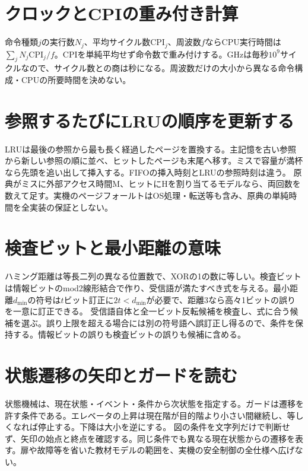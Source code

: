 \section{クロックとCPIの重み付き計算}
\label{theory:information:cpu}
命令種類\(j\)の実行数\(N_j\)、平均サイクル数\(\mathrm{CPI}_j\)、周波数\(f\)ならCPU実行時間は\(\sum_jN_j\mathrm{CPI}_j/f\)。CPIを単純平均せず命令数で重み付けする。GHzは毎秒\(10^9\)サイクルなので、サイクル数との商は秒になる。周波数だけの大小から異なる命令構成・CPUの所要時間を決めない。

\section{参照するたびにLRUの順序を更新する}
\label{theory:information:lru}
LRUは最後の参照から最も長く経過したページを置換する。主記憶を古い参照から新しい参照の順に並べ、ヒットしたページも末尾へ移す。ミスで容量が満杯なら先頭を追い出して挿入する。FIFOの挿入時刻とLRUの参照時刻は違う。
原典がミスに外部アクセス時間M、ヒットにHを割り当てるモデルなら、両回数を数えて足す。実機のページフォールトはOS処理・転送等も含み、原典の単純時間を全実装の保証としない。

\section{検査ビットと最小距離の意味}
\label{theory:information:hamming}
ハミング距離は等長二列の異なる位置数で、XORの1の数に等しい。検査ビットは情報ビットのmod2線形結合で作り、受信語が満たすべき式を与える。最小距離\(d_{\min}\)の符号は\(t\)ビット訂正に\(2t<d_{\min}\)が必要で、距離3なら高々1ビットの誤りを一意に訂正できる。
受信語自体と全一ビット反転候補を検査し、式に合う候補を選ぶ。誤り上限を超える場合には別の符号語へ誤訂正し得るので、条件を保持する。情報ビットの誤りも検査ビットの誤りも候補に含める。

\section{状態遷移の矢印とガードを読む}
\label{theory:information:state}
状態機械は、現在状態・イベント・条件から次状態を指定する。ガードは遷移を許す条件である。エレベータの上昇は現在階が目的階より小さい間継続し、等しくなれば停止する。下降は大小を逆にする。
図の条件を文字列だけで判断せず、矢印の始点と終点を確認する。同じ条件でも異なる現在状態からの遷移を表す。扉や故障等を省いた教材モデルの範囲を、実機の安全制御の全仕様へ広げない。
